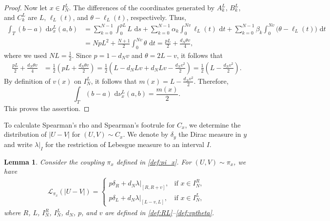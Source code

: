 \documentclass{article}
\newtheorem{lemma}[theorem]{Lemma}
\newcommand{\de}{\mathrm{\,d}}
\newcommand{\lam}{\lambda}
\begin{document}
\begin{proof}
Now let \(x\in I_N^L\).
The differences of the coordinates generated by \(A_k^L\), \(B_k^L\), and \(C_k^L\) are \(L\), \(\ell_L(t)\), and \(\theta-\ell_L(t)\), respectively.
Thus,
\begin{align*}
    \int_T(b-a)\,\de\nu_x^L(a,b)
    &=
    \sum_{k=0}^{N-1}\int_0^{pL}L\,\de s
    +\sum_{k=0}^{N-1}\alpha_k
    \int_0^{Nv}\ell_L(t)\,\de t
    +
    \sum_{k=0}^{N-1}\beta_k
    \int_0^{Nv}\bigl(\theta-\ell_L(t)\bigr)\,\de t\\
    &=
    NpL^2
    +
    \frac{N+1}{2}
    \int_0^{Nv}\theta\,\de t
    =
    \frac{pL}{2}
    +
    \frac{d_N\theta v}{4},
\end{align*}
where we used \(NL=\frac12\).
Since \(p=1-d_Nv\) and \(\theta=2L-v\), it follows that
\begin{align*}
    \frac{pL}{2}+\frac{d_N\theta v}{4}
    &=
    \frac12
    \left(
        pL+\frac{d_N\theta v}{2}
    \right)
    =
    \frac12
    \left(
        L-d_NLv+d_NLv-\frac{d_Nv^2}{2}
    \right)
    =
    \frac12
    \left(
        L-\frac{d_Nv^2}{2}
    \right).
\end{align*}
By definition of \(v(x)\) on \(I_N^L\), it follows that \(m(x)=L-\frac{d_Nv^2}{2}\).
Therefore,
\[
    \int_T(b-a)\,\de\nu_x^L(a,b)
    =
    \frac{m(x)}{2}.
\]
This proves the assertion.
\end{proof}


To calculate Spearman's rho and Spearman's footrule for \(C_x\), we determine the distribution of \(|U-V|\) for \((U,V)\sim C_x\).
We denote by \(\delta_y\) the Dirac measure in \(y\) and write \(\lam\vert_I\) for the restriction of Lebesgue measure to an interval \(I\).

\begin{lemma}\label{lem_U-V}
    Consider the coupling \(\pi_x\) defined in \eqref{def:pi_x}.
    For \((U,V)\sim \pi_x\), we have
    \begin{align}\label{eq:distance-law-right}
    \mathcal L_{\pi_x}(|U-V|)
    = \begin{cases}
        p\delta_R+d_N\lam\vert_{[R,R+v]}, &\text{if } x\in I_N^R,\\
        p\delta_L+d_N\lam\vert_{[L-v,L]}, &\text{if } x\in I_N^L,
    \end{cases}
\end{align}
where \(R\), \(L\), \(I_N^R\), \(I_N^L\), \(d_N\), \(p\), and \(v\) are defined in \eqref{def:RL}--\eqref{def:vptheta}.
\end{lemma}
\end{document}
